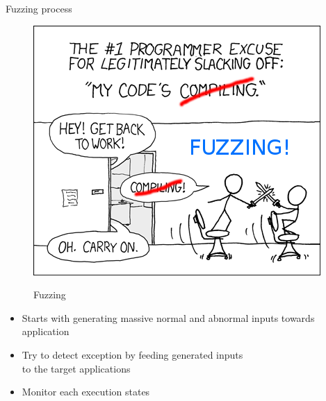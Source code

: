 \documentclass[11pt,t]{beamer}
\begin{document}
\begin{frame}[fragile]{Fuzzing process}  

	\begin{figure}[tbh]
		\centering
		\includegraphics[width=0.3\linewidth]{graphics/fuzzing/fuz.png}
		\label{fig:fuz}
		\caption{Fuzzing \tiny\cite{img}}
	  \end{figure}

	\begin{itemize}
		\item Starts with generating massive normal and abnormal inputs towards application
		\item Try to detect exception by feeding generated inputs \\to the target applications
		\item Monitor each execution states
	\end{itemize}
\sed
\end{frame}
\end{document}
